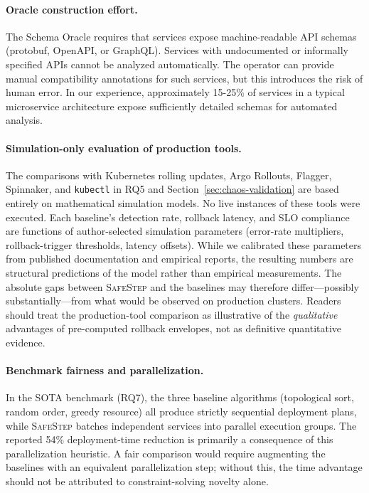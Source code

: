 \documentclass[10pt,twocolumn]{article}
\newcommand{\safestep}{\textsc{SafeStep}}
\begin{document}
\paragraph{Oracle construction effort.}
The Schema Oracle requires that services expose machine-readable
API schemas (protobuf, OpenAPI, or GraphQL). Services with
undocumented or informally specified APIs cannot be analyzed
automatically. The operator can provide manual compatibility
annotations for such services, but this introduces the risk of
human error. In our experience, approximately 15-25\% of
services in a typical microservice architecture expose
sufficiently detailed schemas for automated analysis.

\paragraph{Simulation-only evaluation of production tools.}
The comparisons with Kubernetes rolling updates, Argo Rollouts,
Flagger, Spinnaker, and \texttt{kubectl} in RQ5 and
Section~\ref{sec:chaos-validation} are based entirely on
mathematical simulation models.  No live instances of these
tools were executed.  Each baseline's detection rate, rollback
latency, and SLO compliance are functions of author-selected
simulation parameters (error-rate multipliers, rollback-trigger
thresholds, latency offsets).  While we calibrated these
parameters from published documentation and empirical reports,
the resulting numbers are structural predictions of the model
rather than empirical measurements.  The absolute gaps between
\safestep{} and the baselines may therefore differ---possibly
substantially---from what would be observed on production
clusters.  Readers should treat the production-tool comparison
as illustrative of the \emph{qualitative} advantages of
pre-computed rollback envelopes, not as definitive quantitative
evidence.

\paragraph{Benchmark fairness and parallelization.}
In the SOTA benchmark (RQ7), the three baseline algorithms
(topological sort, random order, greedy resource) all produce
strictly sequential deployment plans, while \safestep{} batches
independent services into parallel execution groups.  The
reported 54\% deployment-time reduction is primarily a
consequence of this parallelization heuristic.  A fair
comparison would require augmenting the baselines with an
equivalent parallelization step; without this, the time
advantage should not be attributed to constraint-solving
novelty alone.
\end{document}
